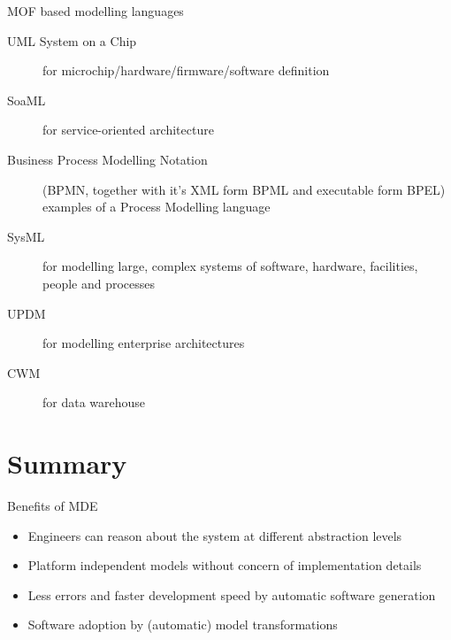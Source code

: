 \documentclass[slidetop,mathserif,red]{beamer}
\begin{document}
\begin{frame}{MOF based modelling languages}
        \begin{description}
        \item [UML System on a Chip]  for microchip/hardware/firmware/software definition

        \item [SoaML] for service-oriented architecture
         
        \item [Business Process Modelling Notation]  (BPMN, together with it's XML form BPML and executable form BPEL) examples of a Process Modelling language
        
         \item [SysML] for modelling large, complex systems of software, hardware, facilities, people and processes

        \item [UPDM] for modelling enterprise architectures

        \item [CWM] for data warehouse
        \end{description}
\end{frame}







\section{Summary}




\begin{frame}{Benefits of MDE}

    \begin{itemize}
    \item Engineers can reason about the system at different abstraction levels
    \item Platform independent models without concern of implementation details
    \item Less errors and faster development speed by automatic software generation
    \item Software adoption by (automatic) model transformations
    \end{itemize}
\end{frame}
\end{document}
